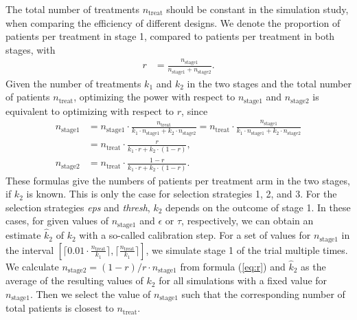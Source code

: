 \documentclass[bimj,fleqn]{w-art}
\theoremstyle{plain}
\theoremstyle{definition}
\begin{document}
The total number of treatments $n_{\text{treat}}$ should be constant in the simulation study, when comparing the efficiency of different designs.
We denote the proportion of patients per treatment in stage 1, compared to patients per treatment in both stages, with 
\begin{align}
  \label{eq:r}
 r & = \frac{n_{\text{stage1}}}{n_{\text{stage1}}+n_{\text{stage2}}}.
\end{align}
Given the number of treatments $k_1$ and $k_2$ in the two stages and the total number of patients $n_{\text{treat}}$, optimizing the power with respect to $n_{\text{stage1}}$ and $n_{\text{stage2}}$ is equivalent to optimizing with respect to $r$, since
\begin{align}
  \label{eq:stagec}
  n_{\text{stage1}} & = 
  n_{\text{stage1}}\cdot \frac{n_{\text{treat}}}{k_1\cdot n_{\text{stage1}}+k_2\cdot n_{\text{stage2}}} = 
  n_{\text{treat}} \cdot \frac{n_{\text{stage1}}}{k_1\cdot n_{\text{stage1}}+k_2\cdot n_{\text{stage2}}} \nonumber \\
  & = n_{\text{treat}}\cdot
  \frac{r}{k_1\cdot
  r+k_2\cdot (1-r)}, \nonumber \\
  n_{\text{stage2}} & =
  n_{\text{treat}}\cdot
  \frac{1-r}{k_1\cdot
  r+k_2\cdot (1-r)}.
\end{align}
These formulas give the numbers of patients per treatment arm in the two stages, if $k_2$ is known. 
This is only the case for selection strategies 1, 2, and 3.
For the selection strategies \emph{eps} and \emph{thresh}, $k_2$ depends on the outcome of stage 1.
In these cases, for given values of $n_{\text{stage1}}$ and $\epsilon$ or $\tau$, respectively, we can  obtain an estimate $\hat{k}_2$ of $k_2$ with a so-called calibration step.
For a set of values for $n_{\text{stage1}}$ in the interval $\left[ \lceil 0.01 \cdot \frac{n_{\text{treat}}}{k_1} \rceil, \lceil \frac{n_{\text{treat}}}{k_1} \rceil \right]$, we simulate stage 1 of the trial multiple times.
We calculate $n_{\text{stage2}} = (1-r)/r\cdot n_{\text{stage1}}$ from formula (\ref{eq:r}) and $\hat{k}_2$ as the average of the resulting values of $k_2$ for all simulations with a fixed value for $n_{\text{stage1}}$.
Then we select the value of $n_{\text{stage1}}$ such that the corresponding number of total patients is closest to $n_{\text{treat}}$.
\end{document}
